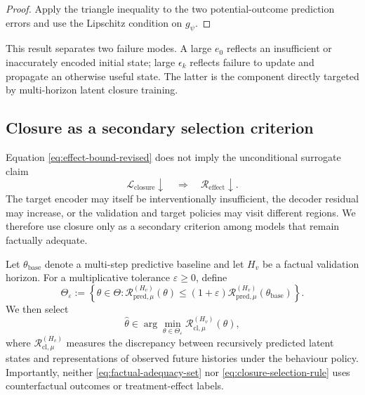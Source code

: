 \begin{proof}
Apply the triangle inequality to the two potential-outcome prediction
errors and use the Lipschitz condition on $g_\psi$.
\end{proof}

This result separates two failure modes. A large $e_0$ reflects an
insufficient or inaccurately encoded initial state; large
$\epsilon_k$ reflects failure to update and propagate an otherwise useful
state. The latter is the component directly targeted by multi-horizon
latent closure training.

\subsection{Closure as a secondary selection criterion}
\label{sec:closure-selection-theory}

Equation \eqref{eq:effect-bound-revised} does not imply the unconditional
surrogate claim
\begin{equation}
    \mathcal L_{\mathrm{closure}}\downarrow
    \quad\Longrightarrow\quad
    \mathcal R_{\mathrm{effect}}\downarrow.
    \label{eq:no-unconditional-surrogate}
\end{equation}
The target encoder may itself be interventionally insufficient, the
decoder residual may increase, or the validation and target policies may
visit different regions. We therefore use closure only as a secondary
criterion among models that remain factually adequate.

Let $\theta_{\mathrm{base}}$ denote a multi-step predictive baseline and
let $H_v$ be a factual validation horizon. For a multiplicative tolerance
$\varepsilon\geq0$, define
\begin{equation}
    \Theta_\varepsilon
    :=\left\{
      \theta\in\Theta:
      \mathcal R_{\mathrm{pred},\mu}^{(H_v)}(\theta)
      \leq
      (1+\varepsilon)
      \mathcal R_{\mathrm{pred},\mu}^{(H_v)}
      (\theta_{\mathrm{base}})
    \right\}.
    \label{eq:factual-adequacy-set}
\end{equation}
We then select
\begin{equation}
    \widehat\theta
    \in\arg\min_{\theta\in\Theta_\varepsilon}
    \mathcal R_{\mathrm{cl},\mu}^{(H_v)}(\theta),
    \label{eq:closure-selection-rule}
\end{equation}
where $\mathcal R_{\mathrm{cl},\mu}^{(H_v)}$ measures the discrepancy
between recursively predicted latent states and representations of
observed future histories under the behaviour policy. Importantly,
neither \eqref{eq:factual-adequacy-set} nor
\eqref{eq:closure-selection-rule} uses counterfactual outcomes or
treatment-effect labels.

